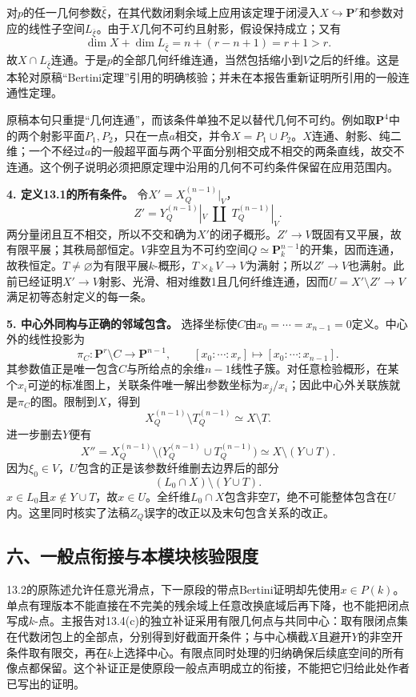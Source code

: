 对$p$的任一几何参数$\bar\xi$，在其代数闭剩余域上应用该定理于闭浸入$X\hookrightarrow\mathbf P^r$和参数对应的线性子空间$L_{\bar\xi}$。由于$X$几何不可约且射影，假设保持成立；又有
\[
\dim X+\dim L_{\bar\xi}
=n+(r-n+1)=r+1>r.
\]
故$X\cap L_{\bar\xi}$连通。于是$p$的全部几何纤维连通，当然包括缩小到$V$之后的纤维。这是本轮对原稿“Bertini定理”引用的明确核验；并未在本报告重新证明所引用的一般连通性定理。

原稿本句只重提“几何连通”，而该条件单独不足以替代几何不可约。例如取$\mathbf P^4$中的两个射影平面$P_1,P_2$，只在一点$a$相交，并令$X=P_1\cup P_2$。$X$连通、射影、纯二维；一个不经过$a$的一般超平面与两个平面分别相交成不相交的两条直线，故交不连通。这个例子说明必须把原定理中沿用的几何不可约条件保留在应用范围内。

\noindent\textbf{4. 定义13.1的所有条件。}
令$X'=X_Q^{(n-1)}|_V$，
\[
Z'=Y_Q^{(n-1)}|_V\;\amalg\;T_Q^{(n-1)}|_V.
\]
两分量闭且互不相交，所以不交和确为$X'$的闭子概形。$Z'\to V$既固有又平展，故有限平展；其秩局部恒定。$V$非空且为不可约空间$Q\simeq\mathbf P^{n-1}_k$的开集，因而连通，故秩恒定。$T\ne\varnothing$为有限平展$k$-概形，$T\times_k V\to V$为满射；所以$Z'\to V$也满射。此前已经证明$X'\to V$射影、光滑、相对维数1且几何纤维连通，因而$U=X'\setminus Z'\to V$满足初等态射定义的每一条。

\noindent\textbf{5. 中心外同构与正确的邻域包含。}
选择坐标使$C$由$x_0=\cdots=x_{n-1}=0$定义。中心外的线性投影为
\[
\pi_C:\mathbf P^r\setminus C\longrightarrow\mathbf P^{n-1},
\qquad [x_0:\cdots:x_r]\longmapsto[x_0:\cdots:x_{n-1}].
\]
其参数值正是唯一包含$C$与所给点的余维$n-1$线性子簇。对任意检验概形，在某个$x_i$可逆的标准图上，关联条件唯一解出参数坐标为$x_j/x_i$；因此中心外关联族就是$\pi_C$的图。限制到$X$，得到
\[
X_Q^{(n-1)}\setminus T_Q^{(n-1)}\simeq X\setminus T.
\]
进一步删去$Y$便有
\[
X''=X_Q^{(n-1)}\setminus\bigl(Y_Q^{(n-1)}\cup T_Q^{(n-1)}\bigr)
\simeq X\setminus(Y\cup T).
\]
因为$\xi_0\in V$，$U$包含的正是该参数纤维删去边界后的部分
\[
(L_0\cap X)\setminus(Y\cup T).
\]
$x\in L_0$且$x\notin Y\cup T$，故$x\in U$。全纤维$L_0\cap X$包含非空$T$，绝不可能整体包含在$U$内。这里同时核实了法稿$Z_Q$误字的改正以及末句包含关系的改正。

\subsection*{六、一般点衔接与本模块核验限度}

13.2的原陈述允许任意光滑点，下一原段的带点Bertini证明却先使用$x\in P(k)$。单点有理版本不能直接在不完美的残余域上任意改换底域后再下降，也不能把闭点写成$k$-点。主报告对13.4(c)的独立补证采用有限几何点与共同中心：取有限闭点集在代数闭包上的全部点，分别得到好截面开条件；与中心横截$X$且避开$Y$的非空开条件取有限交，再在$k$上选择中心。有限点同时处理的归纳确保后续底空间的所有像点都保留。这个补证正是使原段一般点声明成立的衔接，不能把它归给此处作者已写出的证明。

